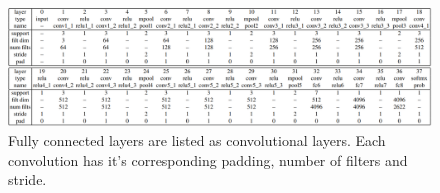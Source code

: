 \begin{figure}[h]	\includegraphics[width=\linewidth]{images/vggface.png} 
\caption{Fully connected layers are listed as convolutional layers. Each convolution has it's corresponding padding, number of filters and stride. \cite{Parkhi2015DeepRecognition} } 
\label{table:vggface}
\end{figure}